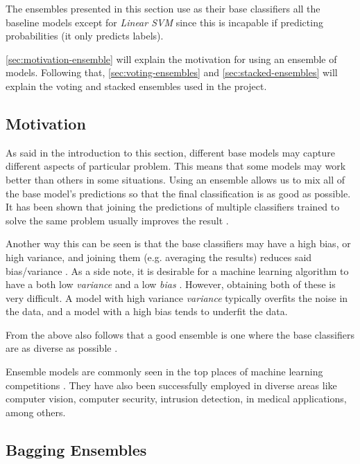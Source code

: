 \documentclass[epsfig,a4paper,11pt,titlepage,twoside,openany]{book}
\begin{document}
The ensembles presented in this section use as their base classifiers all the baseline models except for \textit{Linear SVM} since this is incapable if predicting probabilities (it only predicts labels). 

\autoref{sec:motivation-ensemble} will explain the motivation for using an ensemble of models. Following that, \autoref{sec:voting-ensembles} and \autoref{sec:stacked-ensembles} will explain the voting and stacked ensembles used in the project.


\subsection{Motivation} 
\label{sec:motivation-ensemble}

As said in the introduction to this section, different base models may capture different aspects of particular problem. This means that some models may work better than others in some situations. Using an ensemble allows us to mix all of the base model's predictions so that the final classification is as good as possible. It has been shown that joining the predictions of multiple classifiers trained to solve the same problem usually improves the result \cite{opitz1999popular,Hansen1990,Schapire1990}.

Another way this can be seen is that the base classifiers may have a high bias, or high variance, and joining them (e.g. averaging the results) reduces said bias/variance \cite{Breiman1996_bagging_predictors}. As a side note, it is desirable for a machine learning algorithm to have a both low \textit{variance} and a low \textit{bias} \cite{Munro2011_bias_variance_decomp}. However, obtaining both of these is very difficult. A model with high variance \textit{variance} typically overfits the noise in the data, and a model with a high bias tends to underfit the data. 

From the above also follows that a good ensemble is one where the base classifiers are as diverse as possible \cite{zhou2012ensemble}. 

Ensemble models are commonly seen in the top places of machine learning competitions \cite{Bell:2007_netflix_competition}. They have also been successfully employed in diverse areas \cite{zhou2012ensemble} like computer vision, computer security, intrusion detection, in medical applications, among others.


\subsection{Bagging Ensembles}
\label{sec:bagging-ensembles}
\end{document}
